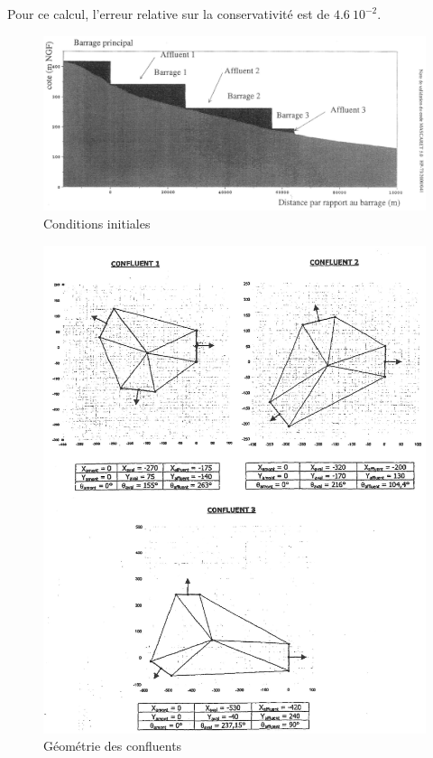 \documentclass[a4paper,10pt]{article}
\begin{document}
Pour ce calcul, l'erreur relative sur la conservativité est de $4.6\ 10^{-2}$.


\begin{figure}
 \begin{center}
  \includegraphics[angle=0,width=17cm]{cond_ini.eps}
  \caption{Conditions initiales}
  \label{fig1}
 \end{center}
\end{figure}

\begin{figure}
 \begin{center}
  \includegraphics[angle=0,width=17cm]{geom_conflu.eps}
  \caption{Géométrie des confluents}
  \label{fig2}
 \end{center}
\end{figure}
\end{document}
